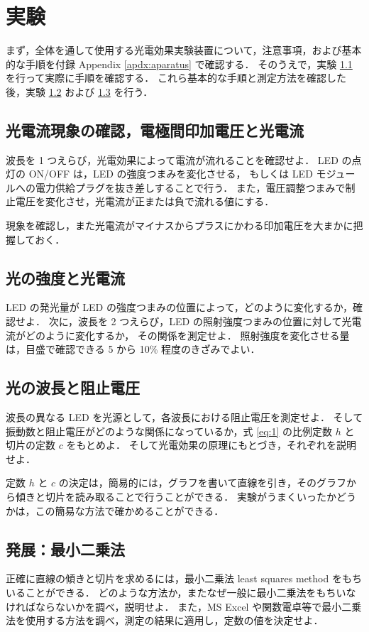 \documentclass[11pt,sort]{jarticle}
\begin{document}
\section{実験}

まず，全体を通して使用する光電効果実験装置について，注意事項，および基本的な手順を付録 Appendix \ref{apdx:aparatus} で確認する．
そのうえで，実験 \ref{a} を行って実際に手順を確認する．
これら基本的な手順と測定方法を確認した後，実験 \ref{b} および \ref{c} を行う．


\subsection{光電流現象の確認，電極間印加電圧と光電流}\label{a}

波長を 1 つえらび，光電効果によって電流が流れることを確認せよ．
LED の点灯の ON/OFF は，LED の強度つまみを変化させる，
もしくは LED モジュールへの電力供給プラグを抜き差しすることで行う．
また，電圧調整つまみで制止電圧を変化させ，光電流が正または負で流れる値にする．

現象を確認し，また光電流がマイナスからプラスにかわる印加電圧を大まかに把握しておく．

\subsection{光の強度と光電流}\label{b}

LED の発光量が LED の強度つまみの位置によって，どのように変化するか，確認せよ．
次に，波長を 2 つえらび，LED の照射強度つまみの位置に対して光電流がどのように変化するか，
その関係を測定せよ．
照射強度を変化させる量は，目盛で確認できる 5 から 10\% 程度のきざみでよい．

\subsection{光の波長と阻止電圧}\label{c}

波長の異なる LED を光源として，各波長における阻止電圧を測定せよ．
そして振動数と阻止電圧がどのような関係になっているか，式 \ref{eq:1} の比例定数 $h$ と切片の定数 $c$ をもとめよ．
そして光電効果の原理にもとづき，それぞれを説明せよ．

定数 $h$ と $c$ の決定は，簡易的には，グラフを書いて直線を引き，そのグラフから傾きと切片を読み取ることで行うことができる．
実験がうまくいったかどうかは，この簡易な方法で確かめることができる．

\subsection{発展：最小二乗法}
正確に直線の傾きと切片を求めるには，最小二乗法 least squares method をもちいることができる．
どのような方法か，またなぜ一般に最小二乗法をもちいなければならないかを調べ，説明せよ．
また，MS Excel や関数電卓等で最小二乗法を使用する方法を調べ，測定の結果に適用し，定数の値を決定せよ．
\end{document}
